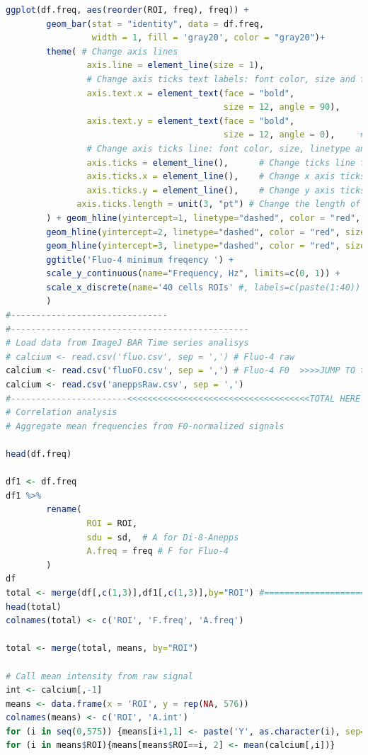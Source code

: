 \documentclass{biophys-new}
\begin{document}
\begin{lstlisting}[language=R]
ggplot(df.freq, aes(reorder(ROI, freq), freq)) +
        geom_bar(stat = "identity", data = df.freq,
                 width = 1, fill = 'gray20', color = "gray20")+
        theme( # Change axis lines
                axis.line = element_line(size = 1),
                # Change axis ticks text labels: font color, size and face
                axis.text.x = element_text(face = "bold",
                                           size = 12, angle = 90),     # Change x axis tick labels only
                axis.text.y = element_text(face = "bold",
                                           size = 12, angle = 0),     # Change y axis tick labels only
                # Change axis ticks line: font color, size, linetype and length
                axis.ticks = element_line(),      # Change ticks line fo all axes
                axis.ticks.x = element_line(),    # Change x axis ticks only
                axis.ticks.y = element_line(),    # Change y axis ticks only
              axis.ticks.length = unit(3, "pt") # Change the length of tick
        ) + geom_hline(yintercept=1, linetype="dashed", color = "red", size = 1) +
        geom_hline(yintercept=2, linetype="dashed", color = "red", size = 1) +
        geom_hline(yintercept=3, linetype="dashed", color = "red", size = 1) +
        ggtitle('Fluo-4 minimum freqency ') +
        scale_y_continuous(name="Frequency, Hz", limits=c(0, 1)) +
        scale_x_discrete(name='40 cells ROIs' #, labels=c(paste(1:40))
        )
#-------------------------------
#-----------------------------------------------
# Load data from ImageJ BAR Time series analisys
# calcium <- read.csv('fluo.csv', sep = ',') # Fluo-4 raw
calcium <- read.csv('fluoFO.csv', sep = ',') # Fluo-4 F0  >>>>JUMP TO total
calcium <- read.csv('aneppsRaw.csv', sep = ',')
#-----------------------<<<<<<<<<<<<<<<<<<<<<<<<<<<<<<<<<<<<TOTAL HERE
# Correlation analysis
# Aggregate mean frequencies from F0-normalized signals

head(df.freq)

df1 <- df.freq
df1 %>%
        rename(
                ROI = ROI,
                sdu = sd,  # A for Di-8-Anepps
                A.freq = freq # F for Fluo-4
        )
df
total <- merge(df[,c(1,3)],df1[,c(1,3)],by="ROI") #===========================
head(total)
colnames(total) <- c('ROI', 'F.freq', 'A.freq')

total <- merge(total, means, by="ROI")

# Call mean intensity from raw signal
int <- calcium[,-1]
means <- data.frame(x = 'ROI', y = rep(NA, 576))
colnames(means) <- c('ROI', 'A.int')
for (i in seq(0,575)) {means[i+1,1] <- paste('Y', as.character(i), sep="")}
for (i in means$ROI){means[means$ROI==i, 2] <- mean(calcium[,i])}


\end{lstlisting}
\end{document}
